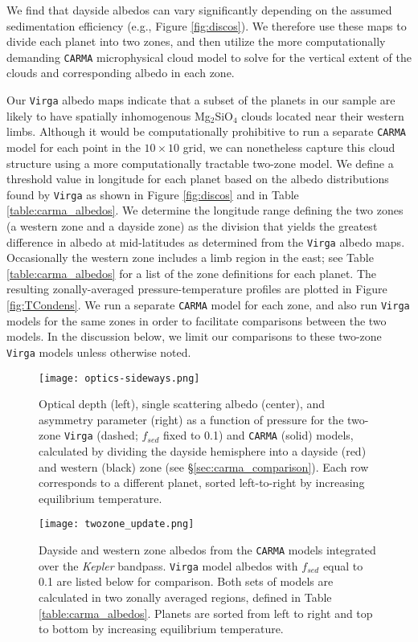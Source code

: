 \documentclass[twocolumn]{aastex63}
\begin{document}
We find that dayside albedos can vary significantly depending on the assumed sedimentation efficiency (e.g., Figure \ref{fig:discos}). We therefore use these maps to divide each planet into two zones, and then utilize the more computationally demanding \texttt{CARMA} microphysical cloud model to solve for the vertical extent of the clouds and corresponding albedo in each zone. 

Our \texttt{Virga} albedo maps indicate that a subset of the planets in our sample are likely to have spatially inhomogenous Mg$_2$SiO$_4$ clouds located near their western limbs. Although it would be computationally prohibitive to run a separate \texttt{CARMA} model for each point in the $10\times10$ grid, we can nonetheless capture this cloud structure using a more computationally tractable two-zone model. We define a threshold value in longitude for each planet based on the albedo distributions found by \texttt{Virga} as shown in Figure \ref{fig:discos} and in Table \ref{table:carma_albedos}. We determine the longitude range defining the two zones (a western zone and a dayside zone) as the division that yields the greatest difference in albedo at mid-latitudes as determined from the \texttt{Virga} albedo maps. Occasionally the western zone includes a limb region in the east; see Table \ref{table:carma_albedos} for a list of the zone definitions for each planet. The resulting zonally-averaged pressure-temperature profiles are plotted in Figure \ref{fig:TCondens}. We run a separate \texttt{CARMA} model for each zone, and also run \texttt{Virga} models for the same zones in order to facilitate comparisons between the two models.  In the discussion below, we limit our comparisons to these two-zone \texttt{Virga} models unless otherwise noted.

\begin{figure*}
    \centering
    \texttt{[image: optics-sideways.png]}
    \caption{Optical depth (left), single scattering albedo (center), and asymmetry parameter (right) as a function of pressure for the two-zone \texttt{Virga} (dashed; $f_{sed}$ fixed to 0.1) and \texttt{CARMA} (solid) models, calculated by dividing the dayside hemisphere into a dayside (red) and western (black) zone (see \S\ref{sec:carma_comparison}). Each row corresponds to a different planet, sorted left-to-right by increasing equilibrium temperature.}
    \label{fig:opd_w_g}
\end{figure*}

\begin{figure*}
    \centering
    \texttt{[image: twozone\_update.png]}
    \caption{Dayside and western zone albedos from the \texttt{CARMA} models integrated over the \emph{Kepler} bandpass.  \texttt{Virga} model albedos with $f_{sed}$ equal to 0.1 are listed below for comparison.  Both sets of models are calculated in two zonally averaged regions, defined in Table \ref{table:carma_albedos}. Planets are sorted from left to right and top to bottom by increasing equilibrium temperature.}
    \label{fig:disco_CARMA}
\end{figure*}
\end{document}
